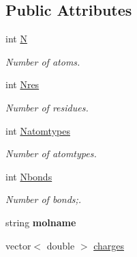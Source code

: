 \subsection*{Public Attributes}
\begin{DoxyCompactItemize}
\item 
\hypertarget{classMol2_a7fcd40f8ea09f926d94e8394afb4751b}{
int \hyperlink{classMol2_a7fcd40f8ea09f926d94e8394afb4751b}{N}}
\label{classMol2_a7fcd40f8ea09f926d94e8394afb4751b}

\begin{DoxyCompactList}\small\item\em Number of atoms. \item\end{DoxyCompactList}\item 
\hypertarget{classMol2_a1cc7fff66596ea277d2ff447082b8808}{
int \hyperlink{classMol2_a1cc7fff66596ea277d2ff447082b8808}{Nres}}
\label{classMol2_a1cc7fff66596ea277d2ff447082b8808}

\begin{DoxyCompactList}\small\item\em Number of residues. \item\end{DoxyCompactList}\item 
\hypertarget{classMol2_abec1d304ce65117eafb1bfc03bd37cae}{
int \hyperlink{classMol2_abec1d304ce65117eafb1bfc03bd37cae}{Natomtypes}}
\label{classMol2_abec1d304ce65117eafb1bfc03bd37cae}

\begin{DoxyCompactList}\small\item\em Number of atomtypes. \item\end{DoxyCompactList}\item 
\hypertarget{classMol2_a2c0dbb3b4214d3f462882f21ac0827d5}{
int \hyperlink{classMol2_a2c0dbb3b4214d3f462882f21ac0827d5}{Nbonds}}
\label{classMol2_a2c0dbb3b4214d3f462882f21ac0827d5}

\begin{DoxyCompactList}\small\item\em Number of bonds;. \item\end{DoxyCompactList}\item 
\hypertarget{classMol2_a55113887837f3028146348ff6a0cc1b4}{
string {\bfseries molname}}
\label{classMol2_a55113887837f3028146348ff6a0cc1b4}

\item 
\hypertarget{classMol2_a85429e831336c4f3044b6cc879a8b656}{
vector$<$ double $>$ \hyperlink{classMol2_a85429e831336c4f3044b6cc879a8b656}{charges}}
\label{classMol2_a85429e831336c4f3044b6cc879a8b656}


\end{DoxyCompactItemize}
